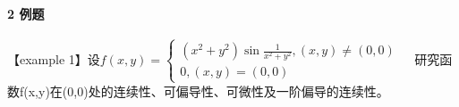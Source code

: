 \documentclass[12pt]{scrartcl}
\begin{document}
{\begin{enumerate}
    
\end{enumerate}

\paragraph*{\large 2 例题}\leavevmode \newline
【example 1】设$f(x,y)=\left\{
    \begin{array}{lr}
    (x^2+y^2)\sin {\frac{1}{x^2+y^2}},(x,y)\neq (0,0) &  \\
    0,(x,y)= (0,0) &  
    \end{array}
    \right.$
    研究函数f(x,y)在(0,0)处的连续性、可偏导性、可微性及一阶偏导的连续性。
\\
\\
\\
\\
\\
\\
\\
}
\end{document}
